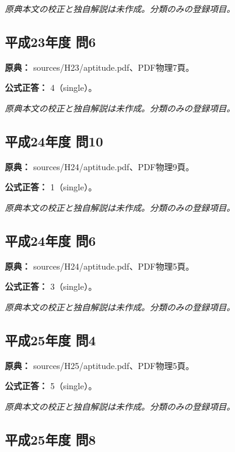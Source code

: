 \par\textit{原典本文の校正と独自解説は未作成。分類のみの登録項目。}

\subsection{平成23年度 問6}
\label{q:h23-reg-apt-06}

\noindent\textbf{原典：} sources/H23/aptitude.pdf、PDF物理7頁。

\textbf{公式正答：} 4（single）。

\par\textit{原典本文の校正と独自解説は未作成。分類のみの登録項目。}

\subsection{平成24年度 問10}
\label{q:h24-reg-apt-10}

\noindent\textbf{原典：} sources/H24/aptitude.pdf、PDF物理9頁。

\textbf{公式正答：} 1（single）。

\par\textit{原典本文の校正と独自解説は未作成。分類のみの登録項目。}

\subsection{平成24年度 問6}
\label{q:h24-reg-apt-06}

\noindent\textbf{原典：} sources/H24/aptitude.pdf、PDF物理5頁。

\textbf{公式正答：} 3（single）。

\par\textit{原典本文の校正と独自解説は未作成。分類のみの登録項目。}

\subsection{平成25年度 問4}
\label{q:h25-reg-apt-04}

\noindent\textbf{原典：} sources/H25/aptitude.pdf、PDF物理5頁。

\textbf{公式正答：} 5（single）。

\par\textit{原典本文の校正と独自解説は未作成。分類のみの登録項目。}

\subsection{平成25年度 問8}
\label{q:h25-reg-apt-08}

